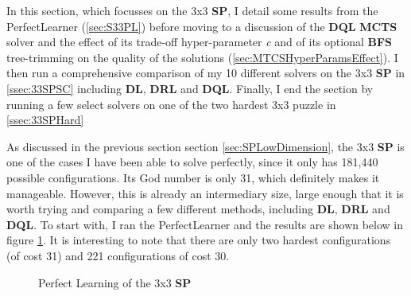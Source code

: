\label{sec:S33}

In this section, which focusses on the 3x3 \textbf{SP}, I detail some results from the PerfectLearner (\ref{sec:S33PL}) before moving to a discussion of the \textbf{DQL} \textbf{MCTS} solver and the effect of its trade-off hyper-parameter \textit{c} and of its optional \textbf{BFS} tree-trimming on the quality of the solutions (\ref{sec:MTCSHyperParamsEffect}). I then run a comprehensive comparison of my 10 different solvers on the 3x3 \textbf{SP} in \ref{ssec:33SPSC} including \textbf{DL},  \textbf{DRL} and  \textbf{DQL}. Finally, I end the section by running a few select solvers on one of the two hardest 3x3 puzzle in \ref{ssec:33SPHard}


\label{sec:S33PL}
As discussed in the previous section section \ref{sec:SPLowDimension}, the 3x3 \textbf{SP} is one of the cases I have been able to solve perfectly, since it only has 181,440 possible configurations. Its God number is only 31, which definitely makes it manageable. However, this is already an intermediary size, large enough that it is worth trying and comparing a few different methods, including \textbf{DL}, \textbf{DRL} and \textbf{DQL}. To start with, I ran the PerfectLearner and the results are shown below in figure \ref{fig:33SPPerfectLearning}. It is interesting to note that there are only two hardest configurations (of cost 31) and 221 configurations of cost 30.


\begin{figure}[H]
  \noindent
  \caption[33SPPerfectLearning]{Perfect Learning of the 3x3 \textbf{SP}}
  \label{fig:33SPPerfectLearning}
\end{figure}




